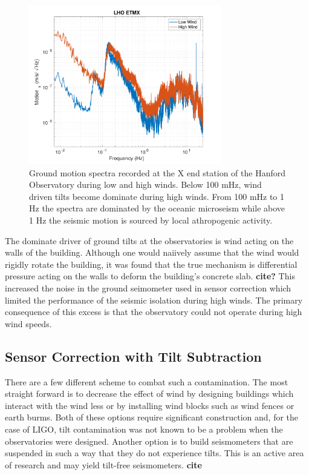 \documentclass [12pt, proquest]{uwthesis}[2019]
\begin{document}
\begin{figure}%
\begin{center}
\includegraphics[width=0.75\textwidth]{windComp.pdf}
\caption{Ground motion spectra recorded at the X end station of the Hanford Observatory during low and high winds. Below 100 mHz, wind driven tilts become dominate during high winds. From 100 mHz to 1 Hz the spectra are dominated by the oceanic microseism while above 1 Hz the seismic motion is sourced by local athropogenic activity.}
\label{wind}
\end{center}
\end{figure}

The dominate driver of ground tilts at the observatories is wind acting on the walls of the building. Although one would naiively assume that the wind would rigidly rotate the building, it was found that the true mechanism is differential pressure acting on the walls to deform the building's concrete slab. \textbf{cite?} This increased the noise in the ground seimometer used in sensor correction which limited the performance of the seismic isolation during high winds. The primary consequence of this excess is that the observatory could not operate during high wind speeds.

\subsection{Sensor Correction with Tilt Subtraction}

\quad There are a few different scheme to combat such a contamination. The most straight forward is to decrease the effect of wind by designing buildings which interact with the wind less or by installing wind blocks such as wind fences or earth burms. Both of these options require significant construction and, for the case of LIGO, tilt contamination was not known to be a problem when the observatories were designed. Another option is to build seismometers that are suspended in such a way that they do not experience tilts. This is an active area of research and may yield tilt-free seismometers. \textbf{cite}
\end{document}
